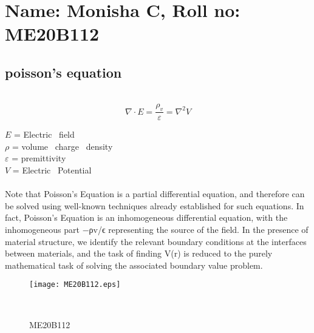 \documentclass[]{article}
\begin{document}
\section{Name: Monisha C, Roll no: ME20B112}
\subsection{poisson's equation}~\cite{poisson's}
\begin{equation}
\nabla \cdot E = \frac{\rho_v}{\varepsilon} = \nabla^2 V
\end {equation}
\begin{flushleft}
$E$ = Electric \ field \\
$\rho$ = volume \ charge \ density \\
$\varepsilon$ = premittivity\\
$V$ = Electric \ Potential
\end{flushleft}

\paragraph{}
Note that Poisson’s Equation is a partial differential equation, and therefore can be solved using well-known techniques already established for such equations. In fact, Poisson’s Equation is an inhomogeneous differential equation, with the inhomogeneous part  −ρv/ϵ  representing the source of the field. In the presence of material structure, we identify the relevant boundary conditions at the interfaces between materials, and the task of finding  V(r)  is reduced to the purely mathematical task of solving the associated boundary value problem.


\begin{figure}[h]
\begin{center}
\texttt{[image: ME20B112.eps]}
\caption{ME20B112}~\cite{me20b112}
\label{fig:poisson}
\end{center}
\end{figure}

\end{document}
